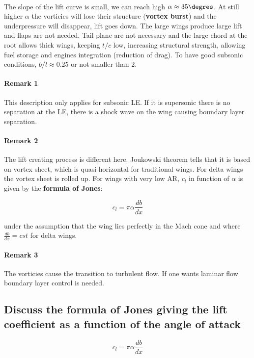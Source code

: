 \documentclass[british,french,11pt, a4paper, openany]{article}
\begin{document}
\ \\
The slope of the lift curve is small, we can reach high $\alpha \approx 35\degres$. At still higher $\alpha$ the vorticies will lose their structure (\textbf{vortex burst}) and the underpressure will disappear, lift goes down. The large wings produce large lift and flaps are not needed. Tail plane are not necessary and the large chord at the root allows thick wings, keeping $t/c$ low, increasing structural strength, allowing fuel storage and engines integration (reduction of drag). To have good subsonic conditions, $b/l \approx 0.25$ or not smaller than 2.

\paragraph{Remark 1}
This description only applies for subsonic LE. If it is supersonic there is no separation at the LE, there is a shock wave on the wing causing boundary layer separation.  

\paragraph{Remark 2}
The lift creating process is different here. Joukowski theorem tells that it is based on vortex sheet, which is quasi horizontal for traditional wings. For delta wings the vortex sheet is rolled up. For wings with very low AR, $c_l$ in function of $\alpha$ is given by the \textbf{formula of Jones}:

\begin{equation}
c_l = \pi \alpha \frac{db}{dx}
\end{equation}	 

under the assumption that the wing lies perfectly in the Mach cone and where $\frac{db}{dx}=cst$ for delta wings. 

\paragraph{Remark 3}
The vorticies cause the transition to turbulent flow. If one wants laminar flow boundary layer control is needed. 

\subsection{Discuss the formula of Jones giving the lift coefficient as a function of the angle of attack}
\begin{equation}
c_l = \pi \alpha \frac{db}{dx}
\end{equation}	 
\end{document}
